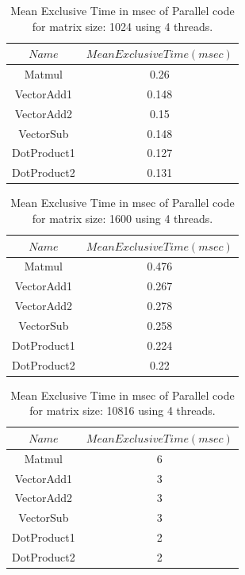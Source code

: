 \documentclass{article}
\begin{document}
\begin{spacing}{1.1}
\begin{table}[H]
\begin{center}
 \begin{tabular}{| c | c|} 
 \hline
$Name$ & $Mean Exclusive Time (msec)$   \\ %
 \hline
Matmul & 0.26 \\ %
VectorAdd1 &  0.148 \\ %
VectorAdd2 &  0.15\\ %
VectorSub &  0.148\\ %
DotProduct1 &  0.127\\ %
DotProduct2 &  0.131\\ %
 \hline
\end{tabular}%
\end{center}
\caption{\label{ll1024} Mean Exclusive Time in msec of Parallel code for matrix size: 1024 using 4 threads. } 
\end{table}

\begin{table}[H]
\begin{center}
 \begin{tabular}{| c | c|} 
 \hline
$Name$ & $Mean Exclusive Time (msec)$   \\ %
 \hline
Matmul & 0.476 \\ %
VectorAdd1 &  0.267 \\ %
VectorAdd2 &  0.278\\ %
VectorSub &  0.258\\ %
DotProduct1 &  0.224\\ %
DotProduct2 &  0.22\\ %
 \hline
\end{tabular}%
\end{center}
\caption{\label{ll1600} Mean Exclusive Time in msec of Parallel code for matrix size: 1600 using 4 threads. } 
\end{table}

\begin{table}[H]
\begin{center}
 \begin{tabular}{| c | c|} 
 \hline
$Name$ & $Mean Exclusive Time (msec)$   \\ %
 \hline
Matmul & 6 \\ %
VectorAdd1 &  3 \\ %
VectorAdd2 &  3\\ %
VectorSub &  3\\ %
DotProduct1 &  2\\ %
DotProduct2 &  2\\ %
 \hline
\end{tabular}%
\end{center}
\caption{\label{ll10816} Mean Exclusive Time in msec of Parallel code for matrix size: 10816 using 4 threads. } 
\end{table}


\end{spacing}
\end{document}
